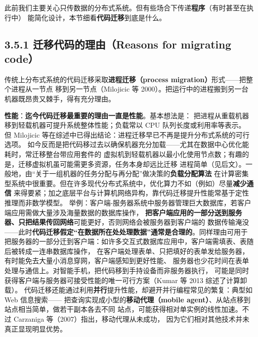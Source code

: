 

此前我们主要关心只传数据的分布式系统。但有些场合下传递\textbf{程序}（有时甚至在执行中）
能简化设计，本节细看\textbf{代码迁移}到底是什么。

\subsection*{3.5.1 迁移代码的理由（Reasons for migrating code）}
传统上分布式系统的代码迁移采取\textbf{进程迁移（process migration）}形式——把整个进程从一节点
移到另一节点（Milojicic 等 2000）。把运行中的进程搬到另一台机器既昂贵又棘手，得有充分理由。

\medskip\noindent\textbf{性能}：\textbf{迄今代码迁移最重要的理由一直是性能}。基本想法是：
把进程从重载机器移到轻载机器可提升系统整体性能；负载常以 CPU 队列长度或利用率等表示。
但 Milojicic 等在综述中已得出结论：进程迁移早已不再是提升分布式系统的可行选项。
如今反而是把代码移过去以确保机器充分加载——尤其在数据中心优化能耗时，常迁移整台带应用套件的
虚拟机到轻载机器以最小化使用节点数；有趣的是，迁移虚拟机虽可能需更多资源，任务本身却远比迁移
进程简单（见后文）。一般地，由“关于一组机器的任务分配与再分配”做决策的\textbf{负载分配算法}
在计算密集型系统中很重要。但在许多现代分布式系统中，优化算力不如（例如）尽量\textbf{减少通信}
来得要紧；加之底层平台与计算机网络异构，靠代码迁移提升性能常基于定性推理而非数学模型。
举例：客户端-服务器系统中服务器管理巨大数据库，若客户端应用需做大量涉及海量数据的数据库操作，
\textbf{把客户端应用的一部分送到服务器、只把结果传回网络}可能更好，否则网络会被服务器到客户端的
数据传输淹没——此时\textbf{代码迁移假定“在数据所在处处理数据”通常是合理的}。同样理由可用于
把服务器的一部分迁到客户端：如许多交互式数据库应用中，客户端需填表、表随后被转成一连串数据库操作，
在客户端处理表单、只把填好的表单发给服务器，有时能免去大量小消息穿网，客户端感知到更好性能、
服务器也少花时间在表单处理与通信上。对智能手机，把代码移到手持设备而非服务器执行，
可能是同时获得客户端与服务器可接受性能的唯一可行方案（Kumar 等 2013 综述了计算卸载）。
代码迁移还能通过利用\textbf{并行}提升性能，却避开并行编程常见的繁复：典型如 Web 信息搜索——
把查询实现成小型的\textbf{移动代理（mobile agent）}、从站点移到站点相当简单，做若干副本各去不同
站点，可能获得相对单实例的线性加速。不过 Carzaniga 等（2007）指出，移动代理从未成功，
因为它们相对其他技术并未真正显现明显优势。

